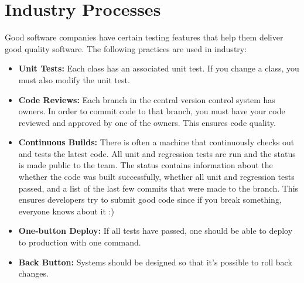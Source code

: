 \documentclass[11pt]{article}
\begin{document}
\section*{Industry Processes}

Good software companies have certain testing features that help them deliver good quality software. The following practices are used in industry:

\begin{itemize}

\item \textbf{Unit Tests:} Each class has an associated unit test. If you change a class, you must also modify the unit test.

\item \textbf{Code Reviews:} Each branch in the central version control system has owners. In order to commit code to that branch, you must have your code reviewed and approved by one of the owners. This ensures code quality.

\item \textbf{Continuous Builds:} There is often a machine that continuously checks out and tests the latest code. All unit and regression tests are run and the status is made public to the team. The status contains information about the whether the code was built successfully, whether all unit and regression tests passed, and a list of the last few commits that were made to the branch. This ensures developers try to submit good code since if you break something, everyone knows about it :)

\item \textbf{One-button Deploy:} If all tests have passed, one should be able to deploy to production
with one command.

\item \textbf{Back Button:} Systems should be designed so that it's possible to roll back changes.
\end{itemize}
\end{document}
